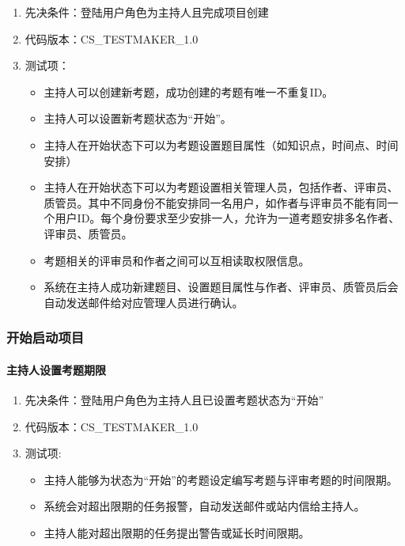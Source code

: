 \documentclass[hyperref, a4paper]{ctexart}
\providecommand{\tightlist}{%
  \setlength{\itemsep}{0pt}\setlength{\parskip}{0pt}}
\let\oldparagraph\paragraph
\renewcommand{\paragraph}[1]{\oldparagraph{#1}\mbox{}}
\begin{document}
\begin{enumerate}
\def\labelenumi{\arabic{enumi}.}
\tightlist
\item
  先决条件：登陆用户角色为主持人且完成项目创建
\item
  代码版本：CS\_TESTMAKER\_1.0
\item
  测试项：

  \begin{itemize}
  \tightlist
  \item
    主持人可以创建新考题，成功创建的考题有唯一不重复ID。
  \item
    主持人可以设置新考题状态为``开始''。
  \item
    主持人在开始状态下可以为考题设置题目属性（如知识点，时间点、时间安排）
  \item
    主持人在开始状态下可以为考题设置相关管理人员，包括作者、评审员、质管员。其中不同身份不能安排同一名用户，如作者与评审员不能有同一个用户ID。每个身份要求至少安排一人，允许为一道考题安排多名作者、评审员、质管员。
  \item
    考题相关的评审员和作者之间可以互相读取权限信息。
  \item
    系统在主持人成功新建题目、设置题目属性与作者、评审员、质管员后会自动发送邮件给对应管理人员进行确认。
  \end{itemize}
\end{enumerate}

\hypertarget{ux5f00ux59cbux542fux52a8ux9879ux76ee}{%
\subsubsection{开始启动项目}\label{ux5f00ux59cbux542fux52a8ux9879ux76ee}}

\hypertarget{ux4e3bux6301ux4ebaux8bbeux7f6eux8003ux9898ux671fux9650}{%
\paragraph{主持人设置考题期限}\label{ux4e3bux6301ux4ebaux8bbeux7f6eux8003ux9898ux671fux9650}}

\begin{enumerate}
\def\labelenumi{\arabic{enumi}.}
\tightlist
\item
  先决条件：登陆用户角色为主持人且已设置考题状态为``开始''
\item
  代码版本：CS\_TESTMAKER\_1.0
\item
  测试项:

  \begin{itemize}
  \tightlist
  \item
    主持人能够为状态为``开始''的考题设定编写考题与评审考题的时间限期。
  \item
    系统会对超出限期的任务报警，自动发送邮件或站内信给主持人。
  \item
    主持人能对超出限期的任务提出警告或延长时间限期。
  \end{itemize}
\end{enumerate}
\end{document}
